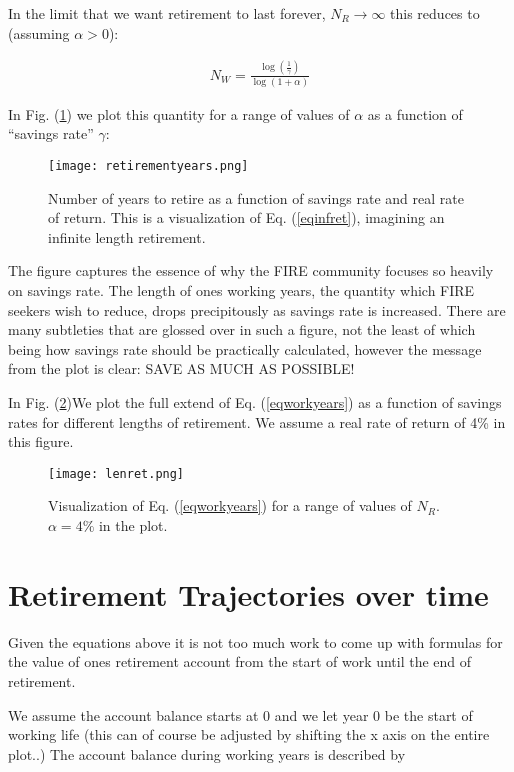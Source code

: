 \documentclass[12pt]{article}
\begin{document}
In the limit that we want retirement to last forever, $N_R\rightarrow\infty$ this reduces to (assuming $\alpha >0$):

\begin{align}
\label{eqinfret}
N_W = \frac{\log\left(\frac{1}{\gamma}\right)}{\log(1+\alpha)}
\end{align}

In Fig. (\ref{figinfret}) we plot this quantity for a range of values of $\alpha$ as a function of ``savings rate'' $\gamma$:

\begin{figure}
  \texttt{[image: retirementyears.png]}
  \caption{Number of years to retire as a function of savings rate and real rate of return. This is a visualization of Eq. (\ref{eqinfret}), imagining an infinite length retirement.}
  \label{figinfret}
\end{figure}

The figure captures the essence of why the FIRE community focuses so heavily on savings rate.
The length of ones working years, the quantity which FIRE seekers wish to reduce, drops precipitously as savings rate is increased.
There are many subtleties that are glossed over in such a figure, not the least of which being how savings rate should be practically calculated, however the message from the plot is clear: SAVE AS MUCH AS POSSIBLE!

In Fig. (\ref{figlenret})We plot the full extend of Eq. (\ref{eqworkyears}) as a function of savings rates for different lengths of retirement. We assume a real rate of return of 4\% in this figure.

\begin{figure}
  \texttt{[image: lenret.png]}
  \caption{Visualization of Eq. (\ref{eqworkyears}) for a range of values of $N_R$. $\alpha=4\%$ in the plot.}
  \label{figlenret}
\end{figure}

\section{Retirement Trajectories over time}

Given the equations above it is not too much work to come up with formulas for the value of ones retirement account from the start of work until the end of retirement.

We assume the account balance starts at 0 and we let year 0 be the start of working life (this can of course be adjusted by shifting the x axis on the entire plot..)
The account balance during working years is described by
\end{document}

